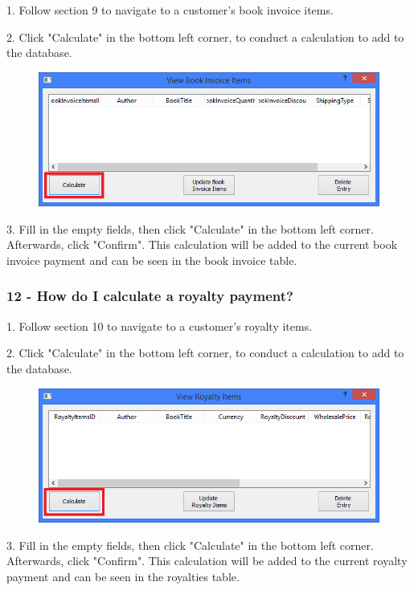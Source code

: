 1. Follow section 9 to navigate to a customer's book invoice items.

2. Click "Calculate" in the bottom left corner, to conduct a calculation to add to the database.

\begin{figure}[H]
    \includegraphics[width=\textwidth]{./Manual/Tutorial/Q11/CalculatePayment.png}
\end{figure}

3. Fill in the empty fields, then click "Calculate" in the bottom left corner. Afterwards, click "Confirm". This calculation will be added to the current book invoice payment and can be seen in the book invoice table.

\subsubsection{12 - How do I calculate a royalty payment?}

1. Follow section 10 to navigate to a customer's royalty items.

2. Click "Calculate" in the bottom left corner, to conduct a calculation to add to the database.

\begin{figure}[H]
    \includegraphics[width=\textwidth]{./Manual/Tutorial/Q12/CalculatePayment.png}
\end{figure}

3. Fill in the empty fields, then click "Calculate" in the bottom left corner. Afterwards, click "Confirm". This calculation will be added to the current royalty payment and can be seen in the royalties table.

